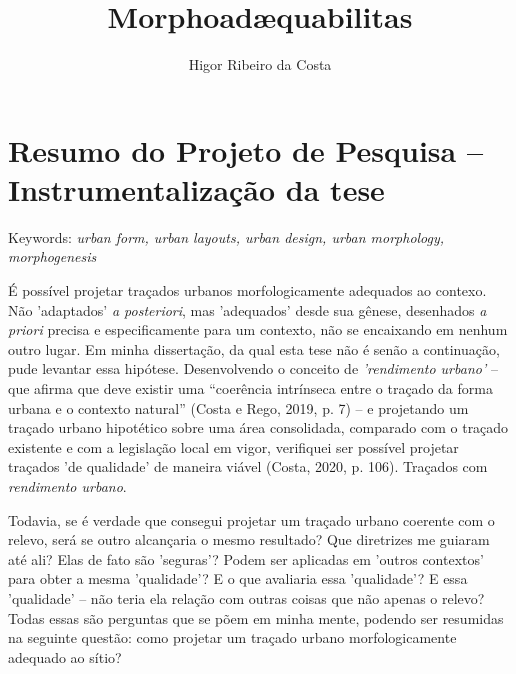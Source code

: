 \documentclass[]{report}
\title{Morphoadæquabilitas}
\author{Higor Ribeiro da Costa}
\begin{document}
\maketitle

\tableofcontents

\begin{abstract}
\end{abstract}

\setcounter{secnumdepth}{0}

\chapter*{Resumo do Projeto de Pesquisa – Instrumentalização da tese}

    Keywords: \textit{urban form, urban layouts, urban design, urban morphology, morphogenesis}

    É possível projetar traçados urbanos morfologicamente adequados ao contexo. Não 'adaptados' \textit{a posteriori}, mas 'adequados' desde sua gênese, desenhados \textit{a priori} precisa e especificamente para um contexto, não se encaixando em nenhum outro lugar. Em minha dissertação, da qual esta tese não é senão a continuação, pude levantar essa hipótese. Desenvolvendo o conceito de \textit{'rendimento urbano'} – que afirma que deve existir uma “coerência intrínseca entre o traçado da forma urbana e o contexto natural” (Costa e Rego, 2019, p. 7) – e projetando um  traçado urbano hipotético sobre uma área consolidada, comparado com o traçado existente e com a legislação local em vigor, verifiquei ser possível projetar traçados 'de qualidade' de maneira viável (Costa, 2020, p. 106). Traçados com \textit{rendimento urbano}.

    Todavia, se é verdade que consegui projetar um traçado urbano coerente com o relevo, será se outro alcançaria o mesmo resultado? Que diretrizes me guiaram até ali? Elas de fato são 'seguras'? Podem ser aplicadas em 'outros contextos' para obter a mesma 'qualidade'? E o que avaliaria essa 'qualidade'? E essa 'qualidade' – não teria ela relação com outras coisas que não apenas o relevo? Todas essas são perguntas que se põem em minha mente, podendo ser resumidas na seguinte questão: como projetar um traçado urbano morfologicamente adequado ao sítio?
\end{document}
